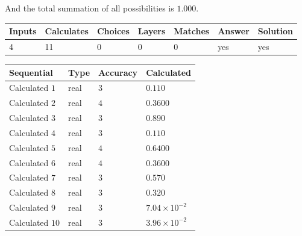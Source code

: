 \documentclass[12pt]{article}
\begin{document}
\noindent
 And the total summation of all possibilities is $  %
1.000 $.
 
 
 
\noindent{}
 
 

 
\vspace{0.3in}
   
   
   
   
\noindent\begin{tabular}{|l|l|l|l|l|l|l|}
 \hline
Inputs & Calculates & Choices & Layers & Matches & Answer & Solution \\ \hline
           4  & 
          11  & 
           0
  & 
           0  & 
           0  & 
  yes & 
  yes 
  \\ \hline
 \end{tabular}
   
   
   
   
\noindent{}
   
   
  
  
\noindent\begin{tabular}{|l|l|l|l|}
\hline
 Sequential & Type & Accuracy & Calculated \\ 
\hline
 
 
  Calculated $            1 $ & real & $            3  $ & 
 $ 0.110 $ 
 \\  \hline  
 
 
  Calculated $            2 $ & real & $            4  $ & 
 $ 0.3600 $ 
 \\  \hline  
 
 
  Calculated $            3 $ & real & $            3  $ & 
 $ 0.890 $ 
 \\  \hline  
 
 
  Calculated $            4 $ & real & $            3  $ & 
 $ 0.110 $ 
 \\  \hline  
 
 
  Calculated $            5 $ & real & $            4  $ & 
 $ 0.6400 $ 
 \\  \hline  
 
 
  Calculated $            6 $ & real & $            4  $ & 
 $ 0.3600 $ 
 \\  \hline  
 
 
  Calculated $            7 $ & real & $            3  $ & 
 $ 0.570 $ 
 \\  \hline  
 
 
  Calculated $            8 $ & real & $            3  $ & 
 $ 0.320 $ 
 \\  \hline  
 
 
  Calculated $            9 $ & real & $            3  $ & 
 $ 7.04 \times 10^{-2} $ 
 \\  \hline  
 
 
  Calculated $           10 $ & real & $            3  $ & 
 $ 3.96 \times 10^{-2} $ 
 \\  \hline  
 \end{tabular}
   
\end{document}

